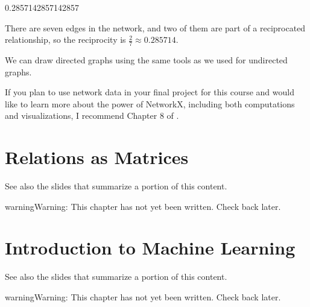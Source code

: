 \documentclass[letterpaper,10pt,english]{sphinxmanual}
\begin{document}
\begin{sphinxVerbatim}[commandchars=\\\{\}]
0.2857142857142857
\end{sphinxVerbatim}

There are seven edges in the network, and two of them are part of a reciprocated relationship, so the reciprocity is \(\frac27\approx0.285714\).

We can draw directed graphs using the same tools as we used for undirected graphs.

\begin{sphinxVerbatim}[commandchars=\\\{\}]
    
\end{sphinxVerbatim}

\noindent{}

If you plan to use network data in your final project for this course and would like to learn more about the power of NetworkX, including both computations and visualizations, I recommend Chapter 8 of .


\chapter{Relations as Matrices}
\label{\detokenize{chapter-16-matrices:relations-as-matrices}}\label{\detokenize{chapter-16-matrices::doc}}
See also the slides that summarize a portion of this content.

\begin{sphinxadmonition}{warning}{Warning:}
This chapter has not yet been written.  Check back later.
\end{sphinxadmonition}


\chapter{Introduction to Machine Learning}
\label{\detokenize{chapter-17-machine-learning:introduction-to-machine-learning}}\label{\detokenize{chapter-17-machine-learning::doc}}
See also the slides that summarize a portion of this content.

\begin{sphinxadmonition}{warning}{Warning:}
This chapter has not yet been written.  Check back later.
\end{sphinxadmonition}
\end{document}
